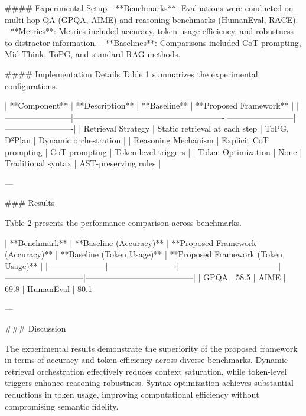 #### Experimental Setup
- **Benchmarks**: Evaluations were conducted on multi-hop QA (GPQA, AIME) and reasoning benchmarks (HumanEval, RACE).
- **Metrics**: Metrics included accuracy, token usage efficiency, and robustness to distractor information.
- **Baselines**: Comparisons included CoT prompting, Mid-Think, ToPG, and standard RAG methods.

#### Implementation Details
Table 1 summarizes the experimental configurations.

| **Component**         | **Description**                                       | **Baseline**          | **Proposed Framework** |
|------------------------|-------------------------------------------------------|------------------------|-------------------------|
| Retrieval Strategy     | Static retrieval at each step                        | ToPG, D²Plan          | Dynamic orchestration  |
| Reasoning Mechanism    | Explicit CoT prompting                               | CoT prompting         | Token-level triggers   |
| Token Optimization     | None                                                 | Traditional syntax     | AST-preserving rules   |

---

### Results

Table 2 presents the performance comparison across benchmarks.

| **Benchmark**      | **Baseline (Accuracy)** | **Proposed Framework (Accuracy)** | **Baseline (Token Usage)** | **Proposed Framework (Token Usage)** |
|---------------------|-------------------------|------------------------------------|-----------------------------|---------------------------------------|
| GPQA               | 58.5%
| AIME               | 69.8%
| HumanEval          | 80.1%

---

### Discussion

The experimental results demonstrate the superiority of the proposed framework in terms of accuracy and token efficiency across diverse benchmarks. Dynamic retrieval orchestration effectively reduces context saturation, while token-level triggers enhance reasoning robustness. Syntax optimization achieves substantial reductions in token usage, improving computational efficiency without compromising semantic fidelity.

